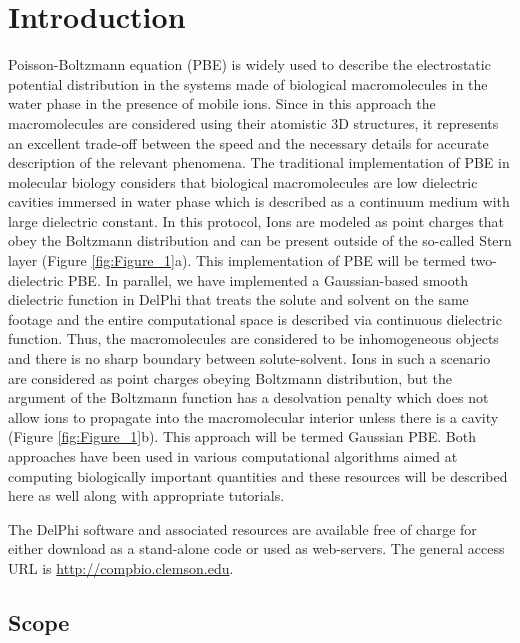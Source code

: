 \documentclass[9pt,tutorial]{livecoms}
\begin{document}
\section{Introduction}
Poisson-Boltzmann equation (PBE) is widely used to describe the electrostatic potential distribution in the systems made of biological macromolecules in the water phase in the presence of mobile ions\cite{xiao2017continuum,li2013progress,jurrus2018improvements,nguyen2017accurate}. Since in this approach the macromolecules are considered using their atomistic 3D structures, it represents an excellent trade-off between the speed and the necessary details for accurate description of the relevant phenomena. The traditional implementation of PBE in molecular biology considers that biological macromolecules are low dielectric cavities immersed in water phase which is described as a continuum medium with large dielectric constant. In this protocol, Ions are modeled as point charges that obey the Boltzmann distribution and can be present outside of the so-called Stern layer (Figure \ref{fig:Figure_1}a). This implementation of PBE will be termed two-dielectric PBE. In parallel, we have implemented a Gaussian-based smooth dielectric function in DelPhi that treats the solute and solvent on the same footage and the entire computational space is described via continuous dielectric function\cite{chakravorty2018gaussian,jia2017treating,li2014modeling,li2013dielectric}. Thus, the macromolecules are considered to be inhomogeneous objects and there is no sharp boundary between solute-solvent. Ions in such a scenario are considered as point charges obeying Boltzmann distribution, but the argument of the Boltzmann function has a desolvation penalty which does not allow ions to propagate into the macromolecular interior unless there is a cavity (Figure \ref{fig:Figure_1}b). This approach will be termed Gaussian PBE. Both approaches have been used in various computational algorithms aimed at computing biologically important quantities and these resources will be described here as well along with appropriate tutorials.

The DelPhi software and associated resources are available free of charge for either download as a stand-alone code or used as web-servers. The general access URL is \url{http://compbio.clemson.edu}. 

\subsection{Scope}
\end{document}
